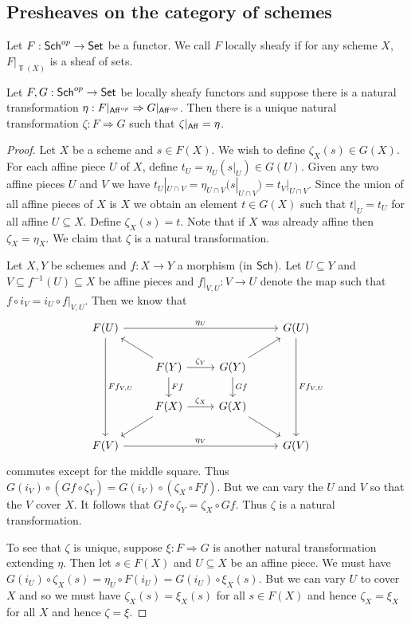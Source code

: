 \documentclass{memoir}
\begin{document}
\subsection{Presheaves on the category of schemes}
\begin{definition}
    Let $F:{\normalfont\mathsf{Sch}}^{op}\to {\normalfont\mathsf{Set}}$ be a functor.
    We call $F$ locally sheafy if for any scheme $X$, $F|_{\Top(X)}$ is a sheaf of sets.
\end{definition}
\begin{thm}
    Let $F,G:{\normalfont\mathsf{Sch}}^{op}\to {\normalfont\mathsf{Set}}$ be locally sheafy functors and suppose there is a natural transformation $\eta:F|_{{\normalfont\mathsf{Aff}}^{op}}\Rightarrow G|_{{\normalfont\mathsf{Aff}}^{op}}$.
    Then there is a unique natural transformation $\zeta:F\Rightarrow G$ such that $\zeta|_{{\normalfont\mathsf{Aff}}} = \eta$.
\end{thm}
\begin{proof}
    Let $X$ be a scheme and $s\in F(X)$.
    We wish to define $\zeta_X(s)\in G(X)$.
    For each affine piece $U$ of $X$, define $t_U = \eta_{U}(s|_{U})\in G(U)$.
    Given any two affine pieces $U$ and $V$ we have $t_U|_{U\cap V} = \eta_{U\cap V}(s|_{U\cap V}) = t_V|_{U\cap V}$.
    Since the union of all affine pieces of $X$ is $X$ we obtain an element $t\in G(X)$ such that $t|_U = t_U$ for all affine $U\subseteq X$.
    Define $\zeta_X(s) = t$.
    Note that if $X$ was already affine then $\zeta_X = \eta_X$.
    We claim that $\zeta$ is a natural transformation.
    
    Let $X,Y$ be schemes and $f:X\to Y$ a morphism (in ${\normalfont\mathsf{Sch}}$).
    Let $U\subseteq Y$ and $V\subseteq f^{-1}(U)\subseteq X$ be affine pieces and $f|_{V,U}:V\to U$ denote the map such that $f \circ i_V = i_U \circ f|_{V,U}$.
    Then we know that 
    \begin{equation}
        \begin{tikzcd}
            F(U) \arrow[rrr,"\eta_U"] \arrow[ddd,"Ff_{V,U}"] & & & G(U) \arrow[ddd,"Ff_{V,U}"] \\
                                         & F(Y) \arrow[r,"\zeta_Y"] \arrow[ul] \arrow[d,"Ff"] & G(Y) \arrow[d,"Gf"] \arrow[ur] & \\
                                        & F(X) \arrow[r,"\zeta_X"] \arrow[dl] & G(X) \arrow[dr] & \\
            F(V) \arrow[rrr,"\eta_V"] & & & G(V)
        \end{tikzcd}
    \end{equation}
    commutes except for the middle square.
    Thus $G(i_V) \circ (Gf \circ \zeta_Y) = G(i_V) \circ (\zeta_X \circ Ff)$.
    But we can vary the $U$ and $V$ so that the $V$ cover $X$.
    It follows that $Gf \circ \zeta_Y = \zeta_X \circ Gf$.
    Thus $\zeta$ is a natural transformation.

    To see that $\zeta$ is unique, suppose $\xi:F\Rightarrow G$ is another natural transformation extending $\eta$.
    Then let $s\in F(X)$ and $U\subseteq X$ be an affine piece.
    We must have $G(i_U) \circ \zeta_X(s) = \eta_U \circ F(i_U) = G(i_U) \circ \xi_X(s)$.
    But we can vary $U$ to cover $X$ and so we must have $\zeta_X(s) = \xi_X(s)$ for all $s\in F(X)$ and hence $\zeta_X = \xi_X$ for all $X$ and hence $\zeta = \xi$.
\end{proof}
\end{document}

